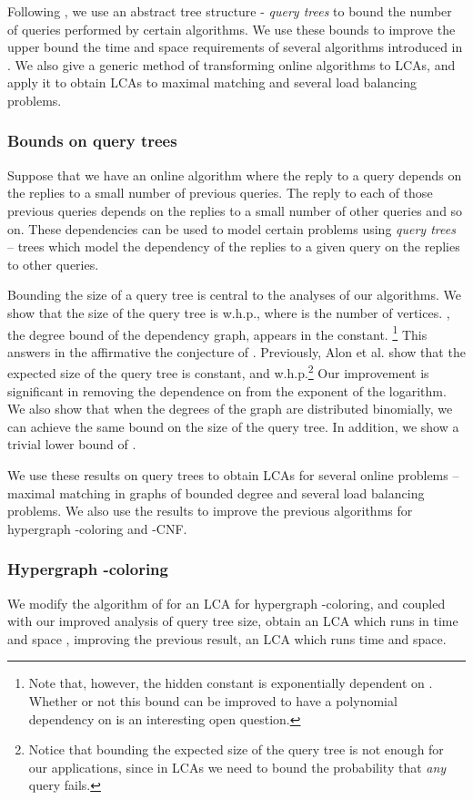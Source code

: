 \documentclass[english, oribibl]{llncs}
\begin{document}
Following  \cite{ARV+11}, we use an abstract tree structure - \emph{query trees} to bound the number of queries performed by certain algorithms. We use these bounds to improve the upper bound the time and space requirements of several algorithms introduced in \cite{ARV+11}. We also give a generic method of transforming online algorithms to LCAs, and apply it to obtain LCAs to maximal matching and several load balancing problems.


\subsubsection{Bounds on query trees}

Suppose that we have an online algorithm where the reply to a query depends
on the replies to a small number of previous queries. The reply to each of those previous queries depends on the replies to a small number of other queries and so on. These dependencies can be used to model certain problems using \emph{query trees} -- trees which model the dependency of the replies to a given query on the replies to other queries. 


Bounding the size of a query tree is central to the analyses of our algorithms.  We show that the size of the query tree is   w.h.p., where  is the number of vertices. , the degree bound of the dependency graph, appears in the constant. \footnote{Note that, however, the hidden constant is exponentially dependent on . Whether or not this bound can be improved to have a polynomial dependency on  is an interesting open question.} This answers in the affirmative the conjecture of \cite{ARV+11}.
Previously, Alon et al. \cite{ARV+11} show that the expected size of the query tree is constant, and   w.h.p.\footnote{Notice that bounding the expected size of the query tree is not enough for our applications, since in LCAs we need to bound the probability that \emph{any} query fails.} Our improvement is significant in removing the dependence on  from the exponent of the logarithm. 
 We also show that when the degrees of the graph are distributed binomially, we can achieve the same bound on the size of the query tree. In addition, we show a trivial lower bound of .
 
We use these results on query trees to obtain LCAs for several online problems -- maximal matching in graphs of bounded degree and several load balancing problems. We also use the results to improve the previous algorithms for hypergraph -coloring and -CNF. 

\subsubsection{Hypergraph -coloring}
We modify the algorithm of \cite{ARV+11} for an LCA for hypergraph -coloring, and coupled with our improved analysis of query tree size, obtain an LCA which runs in time and space , improving the previous result, an LCA which runs   time and space. 
\end{document}
